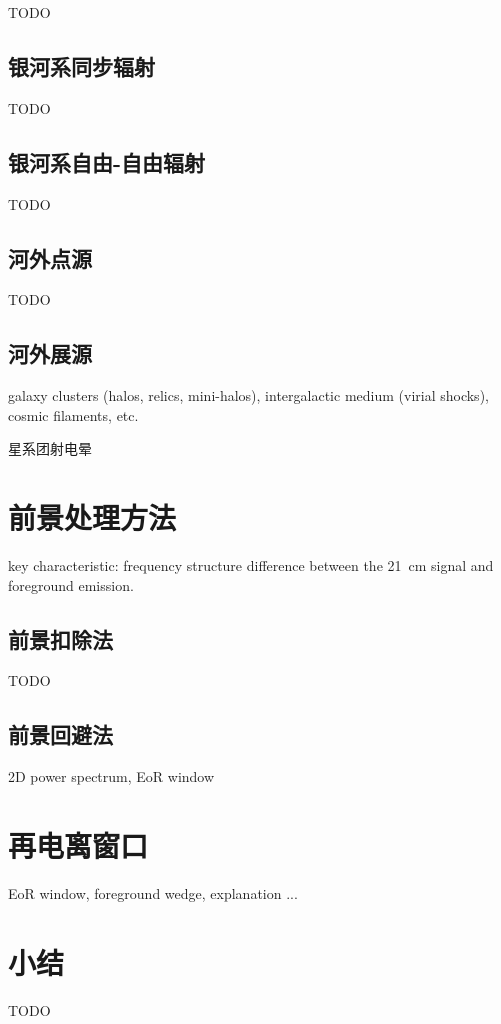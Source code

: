 TODO

\subsection{银河系同步辐射}

TODO

\subsection{银河系自由-自由辐射}

TODO

\subsection{河外点源}

TODO

\subsection{河外展源}

galaxy clusters (halos, relics, mini-halos),
intergalactic medium (virial shocks),
cosmic filaments, etc.

星系团射电晕


\section{前景处理方法}

key characteristic: frequency structure difference between
the 21~cm signal and foreground emission.

\subsection{前景扣除法}

TODO

\subsection{前景回避法}

2D power spectrum, EoR window


\section{再电离窗口}

EoR window, foreground wedge, explanation ...


\section{小结}

TODO


